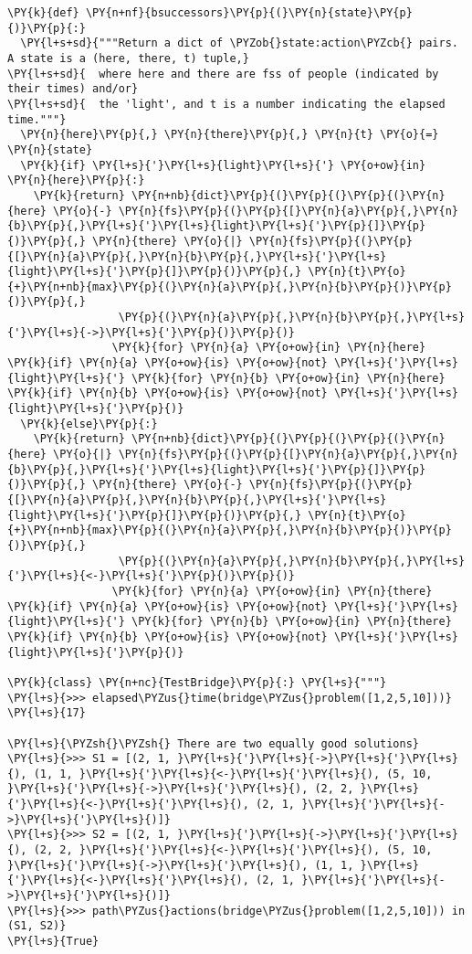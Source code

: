 \begin{Verbatim}[commandchars=\\\{\}]
\PY{k}{def} \PY{n+nf}{bsuccessors}\PY{p}{(}\PY{n}{state}\PY{p}{)}\PY{p}{:}
  \PY{l+s+sd}{"""Return a dict of \PYZob{}state:action\PYZcb{} pairs. A state is a (here, there, t) tuple,}
\PY{l+s+sd}{  where here and there are fss of people (indicated by their times) and/or}
\PY{l+s+sd}{  the 'light', and t is a number indicating the elapsed time."""}
  \PY{n}{here}\PY{p}{,} \PY{n}{there}\PY{p}{,} \PY{n}{t} \PY{o}{=} \PY{n}{state}
  \PY{k}{if} \PY{l+s}{'}\PY{l+s}{light}\PY{l+s}{'} \PY{o+ow}{in} \PY{n}{here}\PY{p}{:}
    \PY{k}{return} \PY{n+nb}{dict}\PY{p}{(}\PY{p}{(}\PY{p}{(}\PY{n}{here} \PY{o}{-} \PY{n}{fs}\PY{p}{(}\PY{p}{[}\PY{n}{a}\PY{p}{,}\PY{n}{b}\PY{p}{,}\PY{l+s}{'}\PY{l+s}{light}\PY{l+s}{'}\PY{p}{]}\PY{p}{)}\PY{p}{,} \PY{n}{there} \PY{o}{|} \PY{n}{fs}\PY{p}{(}\PY{p}{[}\PY{n}{a}\PY{p}{,}\PY{n}{b}\PY{p}{,}\PY{l+s}{'}\PY{l+s}{light}\PY{l+s}{'}\PY{p}{]}\PY{p}{)}\PY{p}{,} \PY{n}{t}\PY{o}{+}\PY{n+nb}{max}\PY{p}{(}\PY{n}{a}\PY{p}{,}\PY{n}{b}\PY{p}{)}\PY{p}{)}\PY{p}{,}
                 \PY{p}{(}\PY{n}{a}\PY{p}{,}\PY{n}{b}\PY{p}{,}\PY{l+s}{'}\PY{l+s}{->}\PY{l+s}{'}\PY{p}{)}\PY{p}{)}
                \PY{k}{for} \PY{n}{a} \PY{o+ow}{in} \PY{n}{here} \PY{k}{if} \PY{n}{a} \PY{o+ow}{is} \PY{o+ow}{not} \PY{l+s}{'}\PY{l+s}{light}\PY{l+s}{'} \PY{k}{for} \PY{n}{b} \PY{o+ow}{in} \PY{n}{here} \PY{k}{if} \PY{n}{b} \PY{o+ow}{is} \PY{o+ow}{not} \PY{l+s}{'}\PY{l+s}{light}\PY{l+s}{'}\PY{p}{)}
  \PY{k}{else}\PY{p}{:}
    \PY{k}{return} \PY{n+nb}{dict}\PY{p}{(}\PY{p}{(}\PY{p}{(}\PY{n}{here} \PY{o}{|} \PY{n}{fs}\PY{p}{(}\PY{p}{[}\PY{n}{a}\PY{p}{,}\PY{n}{b}\PY{p}{,}\PY{l+s}{'}\PY{l+s}{light}\PY{l+s}{'}\PY{p}{]}\PY{p}{)}\PY{p}{,} \PY{n}{there} \PY{o}{-} \PY{n}{fs}\PY{p}{(}\PY{p}{[}\PY{n}{a}\PY{p}{,}\PY{n}{b}\PY{p}{,}\PY{l+s}{'}\PY{l+s}{light}\PY{l+s}{'}\PY{p}{]}\PY{p}{)}\PY{p}{,} \PY{n}{t}\PY{o}{+}\PY{n+nb}{max}\PY{p}{(}\PY{n}{a}\PY{p}{,}\PY{n}{b}\PY{p}{)}\PY{p}{)}\PY{p}{,}
                 \PY{p}{(}\PY{n}{a}\PY{p}{,}\PY{n}{b}\PY{p}{,}\PY{l+s}{'}\PY{l+s}{<-}\PY{l+s}{'}\PY{p}{)}\PY{p}{)}
                \PY{k}{for} \PY{n}{a} \PY{o+ow}{in} \PY{n}{there} \PY{k}{if} \PY{n}{a} \PY{o+ow}{is} \PY{o+ow}{not} \PY{l+s}{'}\PY{l+s}{light}\PY{l+s}{'} \PY{k}{for} \PY{n}{b} \PY{o+ow}{in} \PY{n}{there} \PY{k}{if} \PY{n}{b} \PY{o+ow}{is} \PY{o+ow}{not} \PY{l+s}{'}\PY{l+s}{light}\PY{l+s}{'}\PY{p}{)}

\PY{k}{class} \PY{n+nc}{TestBridge}\PY{p}{:} \PY{l+s}{"""}
\PY{l+s}{>>> elapsed\PYZus{}time(bridge\PYZus{}problem([1,2,5,10]))}
\PY{l+s}{17}

\PY{l+s}{\PYZsh{}\PYZsh{} There are two equally good solutions}
\PY{l+s}{>>> S1 = [(2, 1, }\PY{l+s}{'}\PY{l+s}{->}\PY{l+s}{'}\PY{l+s}{), (1, 1, }\PY{l+s}{'}\PY{l+s}{<-}\PY{l+s}{'}\PY{l+s}{), (5, 10, }\PY{l+s}{'}\PY{l+s}{->}\PY{l+s}{'}\PY{l+s}{), (2, 2, }\PY{l+s}{'}\PY{l+s}{<-}\PY{l+s}{'}\PY{l+s}{), (2, 1, }\PY{l+s}{'}\PY{l+s}{->}\PY{l+s}{'}\PY{l+s}{)]}
\PY{l+s}{>>> S2 = [(2, 1, }\PY{l+s}{'}\PY{l+s}{->}\PY{l+s}{'}\PY{l+s}{), (2, 2, }\PY{l+s}{'}\PY{l+s}{<-}\PY{l+s}{'}\PY{l+s}{), (5, 10, }\PY{l+s}{'}\PY{l+s}{->}\PY{l+s}{'}\PY{l+s}{), (1, 1, }\PY{l+s}{'}\PY{l+s}{<-}\PY{l+s}{'}\PY{l+s}{), (2, 1, }\PY{l+s}{'}\PY{l+s}{->}\PY{l+s}{'}\PY{l+s}{)]}
\PY{l+s}{>>> path\PYZus{}actions(bridge\PYZus{}problem([1,2,5,10])) in (S1, S2)}
\PY{l+s}{True}


\end{Verbatim}
